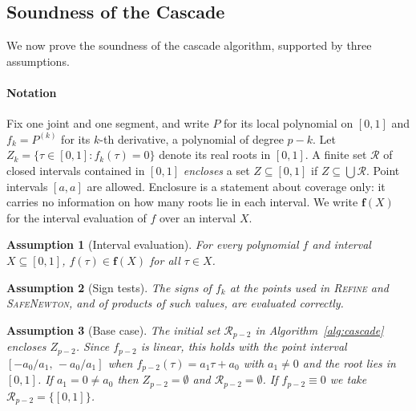 \documentclass[final,5p,times,twocolumn]{elsarticle}
\newtheorem{assumption}{Assumption}
\theoremstyle{definition}
\newcommand{\iv}[1]{\mathbf{#1}}
\begin{document}
\subsection{Soundness of the Cascade}
\label{sec:soundness}

We now prove the soundness of the cascade algorithm, supported by three assumptions.

\paragraph*{Notation}
Fix one joint and one segment, and write $P$ for its local polynomial on $[0,1]$ and $f_k=P^{(k)}$ for its $k$-th derivative, a polynomial of degree $p-k$. Let $Z_k=\{\tau\in[0,1]: f_k(\tau)=0\}$ denote its real roots in $[0,1]$. A finite set $\mathcal{R}$ of closed intervals contained in $[0,1]$ \emph{encloses} a set $Z\subseteq[0,1]$ if $Z\subseteq\bigcup\mathcal{R}$. Point intervals $[a,a]$ are allowed. Enclosure is a statement about coverage only: it carries no information on how many roots lie in each interval. We write $\iv{f}(X)$ for the interval evaluation of $f$ over an interval $X$.

\begin{assumption}[Interval evaluation]\label{as:ia}
For every polynomial $f$ and interval $X\subseteq[0,1]$, $f(\tau)\in\iv{f}(X)$ for all $\tau\in X$.
\end{assumption}

\begin{assumption}[Sign tests]\label{as:sign}
The signs of $f_k$ at the points used in \textsc{Refine} and \textsc{SafeNewton}, and of products of such values, are evaluated correctly.
\end{assumption}

\begin{assumption}[Base case]\label{as:base}
The initial set $\mathcal{R}_{p-2}$ in Algorithm~\ref{alg:cascade} encloses $Z_{p-2}$. Since $f_{p-2}$ is linear, this holds with the point interval $[-a_0/a_1,\,-a_0/a_1]$ when $f_{p-2}(\tau)=a_1\tau+a_0$ with $a_1\neq0$ and the root lies in $[0,1]$. If $a_1=0\neq a_0$ then $Z_{p-2}=\emptyset$ and $\mathcal{R}_{p-2}=\emptyset$. If $f_{p-2}\equiv0$ we take $\mathcal{R}_{p-2}=\{[0,1]\}$.
\end{assumption}
\end{document}
